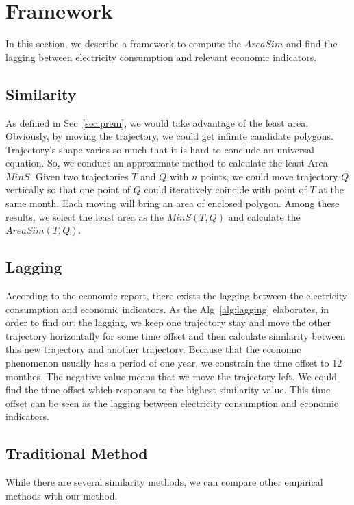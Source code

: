 

%
\section{Framework} \label{sec:alg}
In this section, we describe a framework to compute the $AreaSim$ and  find the lagging between electricity consumption and relevant economic indicators.

\subsection{Similarity}
As defined in Sec~\ref{sec:prem}, we would take advantage of the least area. Obviously, by moving the trajectory, we could get infinite candidate polygons. Trajectory's shape varies so much that it is hard to conclude an universal equation. So, we conduct an approximate method to calculate the least Area $MinS$. Given two trajectories $T$ and $Q$ with $n$ points, we could move trajectory $Q$ vertically so that one point of $Q$ could iteratively coincide with point of $T$ at the same month. Each moving will bring an area of enclosed polygon. Among these results, we select the least area as the $MinS(T, Q)$ and calculate the $AreaSim(T, Q)$.  

\subsection{Lagging}
According to the economic report, there exists the lagging between the electricity consumption and economic indicators. As the Alg~\ref{alg:lagging} elaborates, in order to find out the lagging, we keep one trajectory stay and move the other trajectory horizontally for some time offset and then calculate similarity between this new trajectory and another trajectory. Because that the economic phenomenon usually has a period of one year, we constrain the time offset to 12 monthes. The negative value means that we move the trajectory left. We could find the time offset which responses to the highest similarity value. This time offset can be seen as the lagging between electricity consumption and economic indicators.

\subsection{Traditional Method}
While there are several similarity methods, we can compare other empirical methods with our method. 

